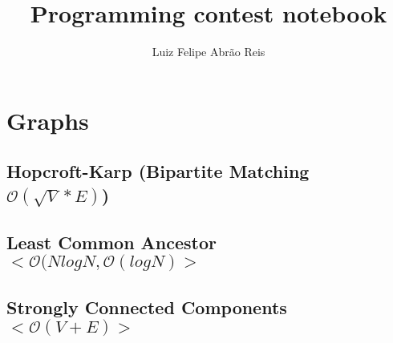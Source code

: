 \documentclass[10pt, a4paper, twoside, notitlepage]{article}
\title{Programming contest notebook}
\author{Luiz Felipe Abrão Reis}
\date{ }
\begin{document}
\begin{titlepage}
\maketitle
\tableofcontents
\end{titlepage}


%
%
%

\section{Graphs}

\subsection{Hopcroft-Karp (Bipartite Matching $\mathcal{O}(\sqrt{V}*E)$)}



\newpage

\subsection{Least Common Ancestor $<\mathcal{O}(N logN, \mathcal{O}(logN)>$}



\newpage

\subsection{Strongly Connected Components $<\mathcal{O}(V+E)>$}



\newpage
\end{document}
